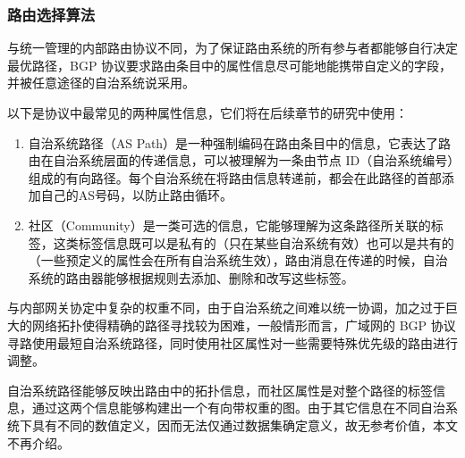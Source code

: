 \subsubsection{路由选择算法}

与统一管理的内部路由协议不同，为了保证路由系统的所有参与者都能够自行决定最优路径，BGP 协议要求路由条目中的属性信息尽可能地能携带自定义的字段，并被任意途径的自治系统说采用。



以下是协议中最常见的两种属性信息，它们将在后续章节的研究中使用：

\begin{enumerate}
    \item 自治系统路径（AS Path）是一种强制编码在路由条目中的信息，它表达了路由在自治系统层面的传递信息，可以被理解为一条由节点 ID（自治系统编号）组成的有向路径。每个自治系统在将路由信息转递前，都会在此路径的首部添加自己的AS号码，以防止路由循环。
    \item 社区（Community）是一类可选的信息，它能够理解为这条路径所关联的标签，这类标签信息既可以是私有的（只在某些自治系统有效）也可以是共有的（一些预定义的属性会在所有自治系统生效），路由消息在传递的时候，自治系统的路由器能够根据规则去添加、删除和改写这些标签。
\end{enumerate}

与内部网关协定中复杂的权重不同，由于自治系统之间难以统一协调，加之过于巨大的网络拓扑使得精确的路径寻找较为困难，一般情形而言，广域网的 BGP 协议寻路使用最短自治系统路径，同时使用社区属性对一些需要特殊优先级的路由进行调整。

自治系统路径能够反映出路由中的拓扑信息，而社区属性是对整个路径的标签信息，通过这两个信息能够构建出一个有向带权重的图。由于其它信息在不同自治系统下具有不同的数值定义，因而无法仅通过数据集确定意义，故无参考价值，本文不再介绍。

